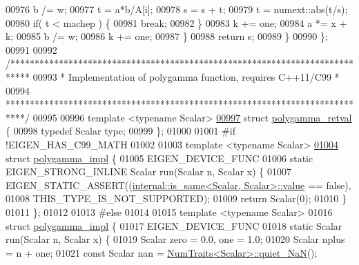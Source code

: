 \begin{DoxyCode}
00976             b /= w;
00977             t = a*b/A[i];
00978             s = s + t;
00979             t = numext::abs(t/s);
00980             \textcolor{keywordflow}{if}( t < machep ) \{
00981               \textcolor{keywordflow}{break};
00982             \}
00983             k += one;
00984             a *= x + k;
00985             b /= w;
00986             k += one;
00987         \}
00988         \textcolor{keywordflow}{return} s;
00989   \}
00990 \};
00991 
00992 \textcolor{comment}{/****************************************************************************}
00993 \textcolor{comment}{ * Implementation of polygamma function, requires C++11/C99                 *}
00994 \textcolor{comment}{ ****************************************************************************/}
00995 
00996 \textcolor{keyword}{template} <\textcolor{keyword}{typename} Scalar>
\hyperlink{struct_eigen_1_1internal_1_1polygamma__retval}{00997} \textcolor{keyword}{struct }\hyperlink{struct_eigen_1_1internal_1_1polygamma__retval}{polygamma\_retval} \{
00998     \textcolor{keyword}{typedef} Scalar type;
00999 \};
01000 
01001 \textcolor{preprocessor}{#if !EIGEN\_HAS\_C99\_MATH}
01002 
01003 \textcolor{keyword}{template} <\textcolor{keyword}{typename} Scalar>
\hyperlink{struct_eigen_1_1internal_1_1polygamma__impl}{01004} \textcolor{keyword}{struct }\hyperlink{struct_eigen_1_1internal_1_1polygamma__impl}{polygamma\_impl} \{
01005     EIGEN\_DEVICE\_FUNC
01006     \textcolor{keyword}{static} EIGEN\_STRONG\_INLINE Scalar run(Scalar n, Scalar x) \{
01007         EIGEN\_STATIC\_ASSERT((\hyperlink{struct_eigen_1_1internal_1_1is__same}{internal::is\_same<Scalar, Scalar>::value}
       == \textcolor{keyword}{false}),
01008                             THIS\_TYPE\_IS\_NOT\_SUPPORTED);
01009         \textcolor{keywordflow}{return} Scalar(0);
01010     \}
01011 \};
01012 
01013 \textcolor{preprocessor}{#else}
01014 
01015 \textcolor{keyword}{template} <\textcolor{keyword}{typename} Scalar>
01016 \textcolor{keyword}{struct }\hyperlink{struct_eigen_1_1internal_1_1polygamma__impl}{polygamma\_impl} \{
01017     EIGEN\_DEVICE\_FUNC
01018     \textcolor{keyword}{static} Scalar run(Scalar n, Scalar x) \{
01019         Scalar zero = 0.0, one = 1.0;
01020         Scalar nplus = n + one;
01021         \textcolor{keyword}{const} Scalar nan = \hyperlink{group___core___module_struct_eigen_1_1_num_traits}{NumTraits<Scalar>::quiet\_NaN}();

\end{DoxyCode}
